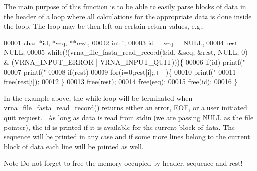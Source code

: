 The main purpose of this function is to be able to easily parse blocks of data in the header of a loop where all calculations for the appropriate data is done inside the loop. The loop may be then left on certain return values, e.\+g.\+: 
\begin{DoxyCode}
00001 char *id, *seq, **rest;
00002 int  i;
00003 id = seq = NULL;
00004 rest = NULL;
00005 while(!(vrna\_file\_fasta\_read\_record(&id, &seq, &rest, NULL, 0) & (VRNA\_INPUT\_ERROR |
       VRNA\_INPUT\_QUIT)))\{
00006   if(id) printf("%
00007   printf("%
00008   if(rest)
00009     for(i=0;rest[i];i++)\{
00010       printf("%
00011       free(rest[i]);
00012     \}
00013   free(rest);
00014   free(seq);
00015   free(id);
00016 \}
\end{DoxyCode}
 In the example above, the while loop will be terminated when \hyperlink{group__file__utils_ga8cfb7e271efc9e1f34640acb85475639}{vrna\+\_\+file\+\_\+fasta\+\_\+read\+\_\+record()} returns either an error, E\+O\+F, or a user initiated quit request.~\newline
 As long as data is read from stdin (we are passing N\+U\+L\+L as the file pointer), the id is printed if it is available for the current block of data. The sequence will be printed in any case and if some more lines belong to the current block of data each line will be printed as well.

\begin{DoxyNote}{Note}
Do not forget to free the memory occupied by header, sequence and rest!
\end{DoxyNote}

